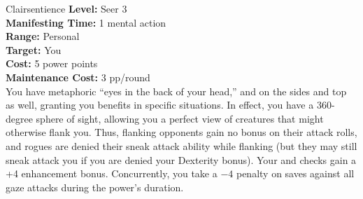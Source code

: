 {Clairsentience}
{
	\textbf{Level:}
	Seer 3\\
	\textbf{Manifesting Time:}
	1 mental action\\
	\textbf{Range:}
	Personal\\
	\textbf{Target:}
	You\\
	\textbf{Cost:}
	5 power points\\
	\textbf{Maintenance Cost:}
	3 pp/round\\
}
{
	You have metaphoric ``eyes in the back of your head,'' and on the sides and top as well, granting you benefits in specific situations. In effect, you have a 360-degree sphere of sight, allowing you a perfect view of creatures that might otherwise flank you. Thus, flanking opponents gain no bonus on their attack rolls, and rogues are denied their sneak attack ability while flanking (but they may still sneak attack you if you are denied your Dexterity bonus). Your  and  checks gain a +4 enhancement bonus. Concurrently, you take a $-4$ penalty on saves against all gaze attacks during the power's duration. 
}